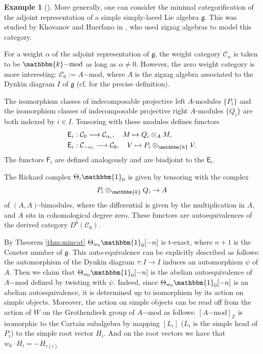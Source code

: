 \documentclass[11pt,reqno]{amsart}
\numberwithin{equation}{section}
\theoremstyle{definition}
\newtheorem{eg}[equation]{Example}
\newenvironment{example}[1][]{\begin{eg}[#1] \pushQED{\qed}}{\popQED \end{eg}}
\theoremstyle{named}
\newcommand{\cC}{\mathcal{C}}
\newcommand{\sE}{\mathsf{E}}
\newcommand{\sF}{\mathsf{F}}
\newcommand{\fg}{\mathfrak{g}}
\newcommand{\kk}{\mathbbm{k}}
\newcommand{\ZZ}{\mathbb{Z}}
\newcommand{\bone}{\mathbbm{1}}
\newcommand{\mmod}{\mathrm{-mod}}
\begin{document}
\begin{example}
More generally, one can consider the minimal categorification of the adjoint representation of a simple simply-laced Lie algebra $\fg$.  This was studied by Khovanov and Huerfano in \cite{HuerKh}, who used zigzag algebras to model this category.  

For a weight $\alpha$ of the adjoint representation of $\fg$, the weight  category $\cC_\alpha$ is taken to be $\kk\mmod$ as long as $\alpha\neq 0$.  However, the zero weight  category is more interesting:  $\cC_0 := A \mmod$, where $A$ is the zigzag algebra associated to the Dynkin diagram $I$ of $\fg$ (cf. \cite{HuerKh} for the precise definition).  

The isomorphism classes of indecomposable projective left $A$-modules $\{P_i\}$ and the isomorphism classes of indecomposable projective right $A$-modules $\{Q_{i}\}$ are both indexed by $i \in I$.  Tensoring with these modules defines functors 
\begin{align*}
	&\sE_i: \cC_0 \longrightarrow \cC_{\alpha_i}, \quad M \mapsto Q_{i} \otimes_{A} M, \\
	&\sE_i : \cC_{-\alpha_i} \longrightarrow \cC_0, \quad  V \mapsto  P_i\otimes_\kk V.
\end{align*}
The functors $\sF_i$ are defined analogously and are biadjoint to the $\sE_i$.

The Rickard complex
$\Theta_i \bone_0$ is given by tensoring with the complex
$$
	P_i\otimes_\kk Q_i \rightarrow A
$$
of $(A,A)$-bimodules, where the differential is given by the multiplication in $A$, and $A$ sits in cohomological degree zero.  These functors are autoequivalences of the derived category $D^b(\cC_0)$.  

By Theorem \ref{thm:mincat}  $\Theta_{w_0}\bone_0[-n]$ is t-exact, where $n+1$ is the Coxeter number of $\fg$.  
This auto-equivalence can be explicitly described as follows: the automorphism of the Dynkin diagram $\tau:I\to I$ induces an automorphism $\psi$ of $A$.  Then we claim that $\Theta_{w_0}\bone_0[-n]$ is the abelian autoequivalence of $A\mmod$ defined by twisting with $\psi$.  Indeed, since $\Theta_{w_0}\bone_0[-n]$ is an abelian autoequivalence, it is determined up to isomorphism by its action on simple objects.  Moreover, the action on simple objects can be read off from the action of $W$ on the Grothendieck group of $A \mmod$ as follows: $[A \mmod]_\ZZ$ is isomorphic to the Cartain subalgebra by mapping $[L_i]$ ($L_i$ is the simple head of $P_i$) to the simple root vector $H_i$.  And on the root vectors we have that $w_0\cdot H_i = -H_{\tau(i)}$ 
\end{example}
\end{document}
